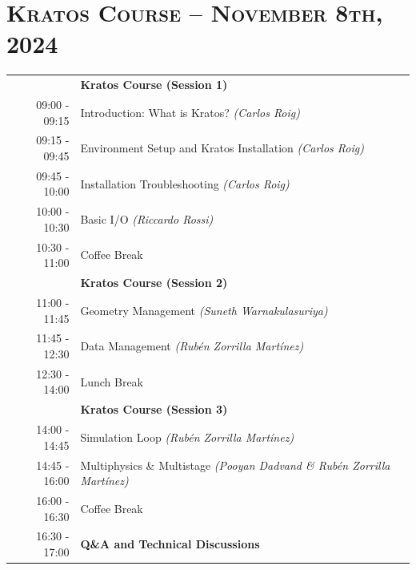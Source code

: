 \documentclass{article}
\begin{document}
\newpage
\section*{\centering \textsc{Kratos Course -- November 8th, 2024}}


\begin{table}[h]\centering
   \begin{tabularx}{0.85\textwidth}{r|X}
      \toprule%
                    & {\large \textbf{Kratos Course (Session 1)}} \\%
      09:00 - 09:15 & Introduction: What is Kratos? \textit{(Carlos Roig)} \\%
      09:15 - 09:45 & Environment Setup and Kratos Installation \textit{(Carlos Roig)} \\%
      09:45 - 10:00 & Installation Troubleshooting \textit{(Carlos Roig)} \\%
      10:00 - 10:30 & Basic I/O \textit{(Riccardo Rossi)} \\%
      \midrule%
      \rowcolor{SeaGreen3!5!} 10:30 - 11:00 & Coffee Break \\%
      \midrule%
                    & {\large \textbf{Kratos Course (Session 2)}} \\%
      11:00 - 11:45 & Geometry Management \textit{(Suneth Warnakulasuriya)} \\%
      11:45 - 12:30 & Data Management \textit{(Rubén Zorrilla Martínez)} \\%
      \midrule%
      \rowcolor{SeaGreen3!5!} 12:30 - 14:00 & Lunch Break \\%
      \midrule%
                    & {\large \textbf{Kratos Course (Session 3)}} \\%
      14:00 - 14:45 & Simulation Loop \textit{(Rubén Zorrilla Martínez)} \\%
      14:45 - 16:00 & Multiphysics \& Multistage \textit{(Pooyan Dadvand \& Rubén Zorrilla Martínez)} \\%
      \midrule%
      \rowcolor{SeaGreen3!5!} 16:00 - 16:30 & Coffee Break \\%
      \midrule%
      16:30 - 17:00 & {\large \textbf{Q\&A and Technical Discussions}} \\%
      \bottomrule
   \end{tabularx}
\end{table}
\end{document}
